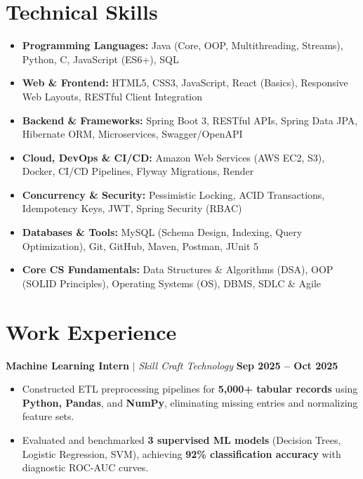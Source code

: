 \documentclass[a4paper,10pt]{article}
\begin{document}
\section*{Technical Skills}
\begin{itemize}
    \item \textbf{Programming Languages:} Java (Core, OOP, Multithreading, Streams), Python, C, JavaScript (ES6+), SQL
    \item \textbf{Web \& Frontend:} HTML5, CSS3, JavaScript, React (Basics), Responsive Web Layouts, RESTful Client Integration
    \item \textbf{Backend \& Frameworks:} Spring Boot 3, RESTful APIs, Spring Data JPA, Hibernate ORM, Microservices, Swagger/OpenAPI
    \item \textbf{Cloud, DevOps \& CI/CD:} Amazon Web Services (AWS EC2, S3), Docker, CI/CD Pipelines, Flyway Migrations, Render
    \item \textbf{Concurrency \& Security:} Pessimistic Locking, ACID Transactions, Idempotency Keys, JWT, Spring Security (RBAC)
    \item \textbf{Databases \& Tools:} MySQL (Schema Design, Indexing, Query Optimization), Git, GitHub, Maven, Postman, JUnit 5
    \item \textbf{Core CS Fundamentals:} Data Structures \& Algorithms (DSA), OOP (SOLID Principles), Operating Systems (OS), DBMS, SDLC \& Agile
\end{itemize}

\vspace{0.5pt}

\section*{Work Experience}

\noindent
\textbf{Machine Learning Intern} \;$|$\; \textit{Skill Craft Technology} \hfill \textbf{Sep 2025 -- Oct 2025}
\begin{itemize}
    \item Constructed ETL preprocessing pipelines for \textbf{5,000+ tabular records} using \textbf{Python, Pandas}, and \textbf{NumPy}, eliminating missing entries and normalizing feature sets.
    \item Evaluated and benchmarked \textbf{3 supervised ML models} (Decision Trees, Logistic Regression, SVM), achieving \textbf{92\% classification accuracy} with diagnostic ROC-AUC curves.
\end{itemize}
\end{document}
